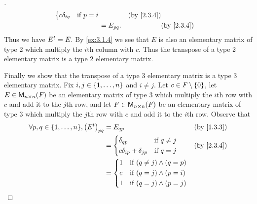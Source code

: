 \begin{proof}[]
\begin{align*}
\begin{dcases}
                                                                c \delta_{i q} & \text{if } p = i
                                                              \end{dcases}    &  & \text{(by \cref{2.3.4})}                          \\
                                                          & = E_{p q}.                                 &  & \text{(by \cref{2.3.4})}
  \end{align*}
  Thus we have \({E}^{t} = E\).
  By \cref{ex:3.1.4} we see that \(E\) is also an elementary matrix of type 2 which multiply the \(i\)th column with \(c\).
  Thus the transpose of a type 2 elementary matrix is a type 2 elementary matrix.

  Finally we show that the transpose of a type 3 elementary matrix is a type 3 elementary matrix.
  Fix \(i, j \in \left\lbrace1, \dots, n\right\rbrace\) and \(i \neq j\).
  Let \(c \in \mathit{F} \setminus \left\lbrace0\right\rbrace\), let \(E \in \mathsf{M}_{{n} \times n}({\mathit{F}})\) be an elementary matrix of type 3 which multiply the \(i\)th row with \(c\) and add it to the \(j\)th row, and let \(F \in \mathsf{M}_{{n} \times n}({\mathit{F}})\) be an elementary matrix of type 3 which multiply the \(j\)th row with \(c\) and add it to the \(i\)th row.
  Observe that
  \begin{align*}
    \forall p, q \in \set{1, \dots, n}, \pa{\tp{E}}_{p q} & = E_{q p}                                              &  & \text{(by \cref{1.3.3})} \\
                                                          & = \begin{dcases}
                                                                \delta_{q p}                  & \text{if } q \neq j \\
                                                                c \delta_{i p} + \delta_{j p} & \text{if } q = j
                                                              \end{dcases} &  & \text{(by \cref{2.3.4})}                                \\
                                                          & = \begin{dcases}
                                                                1 & \text{if } (q \neq j) \land (q = p) \\
                                                                c & \text{if } (q = j) \land (p = i)    \\
                                                                1 & \text{if } (q = j) \land (p = j)    \\

\end{dcases}
\end{align*}
\end{proof}
